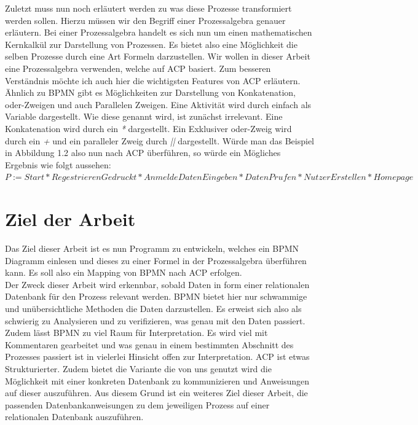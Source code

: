 Zuletzt muss nun noch erläutert werden zu was diese Prozesse transformiert werden sollen. Hierzu müssen wir den Begriff einer Prozessalgebra genauer erläutern. Bei einer Prozessalgebra handelt es sich nun um einen mathematischen Kernkalkül zur Darstellung von Prozessen. Es bietet also eine Möglichkeit die selben Prozesse durch eine Art Formeln darzustellen. Wir wollen in dieser Arbeit eine Prozessalgebra verwenden, welche auf ACP basiert.  Zum besseren Verständnis möchte ich auch hier die wichtigsten Features von ACP erläutern. Ähnlich zu BPMN gibt es Möglichkeiten zur Darstellung von Konkatenation, oder-Zweigen und auch Parallelen Zweigen. Eine Aktivität wird durch einfach als Variable dargestellt. Wie diese genannt wird, ist zunächst irrelevant. Eine Konkatenation wird durch ein \textit{*} dargestellt. Ein Exklusiver oder-Zweig wird durch ein \textit{+} und ein paralleler Zweig durch \textit{||} dargestellt. Würde man das Beispiel in Abbildung 1.2 also nun nach ACP überführen, so würde ein Mögliches Ergebnis wie folgt aussehen:\\
$P:=Start*RegestrierenGedruckt*AnmeldeDatenEingeben*DatenPrufen*NutzerErstellen*Homepage $

\section {Ziel der Arbeit}
Das Ziel dieser Arbeit ist es nun Programm zu entwickeln, welches ein BPMN Diagramm einlesen und dieses zu einer Formel in der Prozessalgebra überführen kann. Es soll also ein Mapping von BPMN nach ACP erfolgen.\\
Der Zweck dieser Arbeit wird erkennbar, sobald Daten in form einer relationalen Datenbank für den Prozess relevant werden. BPMN bietet hier nur schwammige und unübersichtliche Methoden die Daten darzustellen. Es erweist sich also als schwierig zu Analysieren und zu verifizieren, was genau mit den Daten passiert. Zudem lässt BPMN zu viel Raum für Interpretation. Es wird viel mit Kommentaren gearbeitet und was genau in einem bestimmten Abschnitt des Prozesses passiert ist in vielerlei Hinsicht offen zur Interpretation. ACP ist etwas Strukturierter. Zudem bietet die Variante die von uns genutzt wird die Möglichkeit mit einer konkreten Datenbank zu kommunizieren und Anweisungen auf dieser auszuführen. Aus diesem Grund ist ein weiteres Ziel dieser Arbeit, die passenden Datenbankanweisungen zu dem jeweiligen Prozess auf einer relationalen Datenbank auszuführen.




